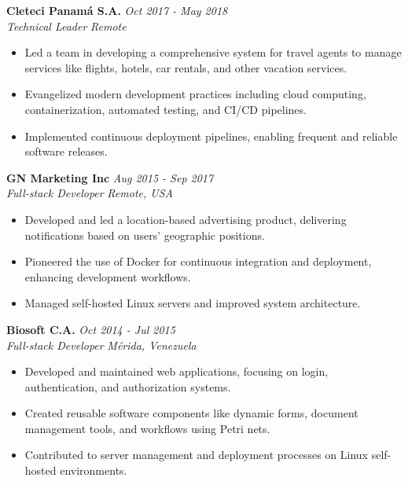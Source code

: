 \documentclass[a4paper,10pt]{article}
\begin{document}
\textbf{Cleteci Panamá S.A.} \hfill \textit{Oct 2017 - May 2018} \\
\textit{Technical Leader} \hfill \textit{Remote} \\
\begin{itemize}[leftmargin=0.5cm, topsep=0pt, parsep=0pt, itemsep=2pt]
	\item Led a team in developing a comprehensive system for travel agents to
	      manage services like flights, hotels, car rentals, and other vacation
	      services.
	\item Evangelized modern development practices including cloud computing,
	      containerization, automated testing, and CI/CD pipelines.
	\item Implemented continuous deployment pipelines, enabling frequent and
	      reliable software releases.
\end{itemize}

\textbf{GN Marketing Inc} \hfill \textit{Aug 2015 - Sep 2017} \\
\textit{Full-stack Developer} \hfill \textit{Remote, USA} \\
\begin{itemize}[leftmargin=0.5cm, topsep=0pt, parsep=0pt, itemsep=2pt]
	\item Developed and led a location-based advertising product, delivering
	      notifications based on users’ geographic positions.
	\item Pioneered the use of Docker for continuous integration and deployment,
	      enhancing development workflows.
	\item Managed self-hosted Linux servers and improved system architecture.
\end{itemize}

\textbf{Biosoft C.A.} \hfill \textit{Oct 2014 - Jul 2015} \\
\textit{Full-stack Developer} \hfill \textit{Mérida, Venezuela} \\
\begin{itemize}[leftmargin=0.5cm, topsep=0pt, parsep=0pt, itemsep=2pt]
	\item Developed and maintained web applications, focusing on login,
	      authentication, and authorization systems.
	\item Created reusable software components like dynamic forms, document
	      management tools, and workflows using Petri nets.
	\item Contributed to server management and deployment processes on Linux
	      self-hosted environments.
\end{itemize}
\end{document}

